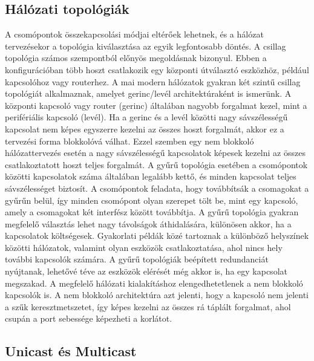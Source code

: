 \subsection{Hálózati topológiák}
A csomópontok összekapcsolási módjai eltérőek lehetnek, és a hálózat tervezésekor a
topológia kiválasztása az egyik legfontosabb döntés. A csillag topológia számos szempontból
előnyös megoldásnak bizonyul. Ebben a konfigurációban több hoszt csatlakozik egy központi
útválasztó eszközhöz, például kapcsolóhoz vagy routerhez. A mai modern hálózatok gyakran
két szintű csillag topológiát alkalmaznak, amelyet gerinc/levél architektúraként is
ismerünk. A központi kapcsoló vagy router (gerinc) általában nagyobb forgalmat
kezel, mint a perifériális kapcsoló (levél). Ha a gerinc és a levél közötti nagy
sávszélességű kapcsolat nem képes egyszerre kezelni az összes hoszt forgalmát, akkor
ez a tervezési forma blokkolóvá válhat. Ezzel szemben egy nem blokkoló hálózattervezés
esetén a nagy sávszélességű kapcsolatok képesek kezelni az összes csatlakoztatott hoszt
teljes forgalmát. A gyűrű topológia esetében a csomópontok közötti kapcsolatok száma
általában legalább kettő, és minden kapcsolat teljes sávszélességet biztosít. A csomópontok
feladata, hogy továbbítsák a csomagokat a gyűrűn belül, így minden csomópont olyan
szerepet tölt be, mint egy kapcsoló, amely a csomagokat két interfész között továbbítja.
A gyűrű topológia gyakran megfelelő választás lehet nagy távolságok áthidalására, különösen
akkor, ha a kapcsolatok költségesek. Gyakorlati példák közé tartoznak a különböző
helyszínek közötti hálózatok, valamint olyan eszközök csatlakoztatása, ahol nincs hely
további kapcsolók számára. A gyűrű topológiák beépített redundanciát nyújtanak, lehetővé
téve az eszközök elérését még akkor is, ha egy kapcsolat megszakad. A megfelelő hálózati
kialakításhoz elengedhetetlenek a nem blokkoló kapcsolók is. A nem blokkoló architektúra
azt jelenti, hogy a kapcsoló nem jelenti a szűk keresztmetszetet, így képes kezelni az
összes rá táplált forgalmat, ahol csupán a port sebessége képezheti a korlátot.


\subsection{Unicast és Multicast} %

